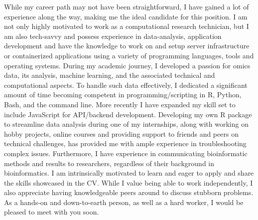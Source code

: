 \documentclass[11pt, a4paper]{awesome-cv}
\begin{document}
\begin{cvletter}
While my career path may not have been straightforward, I have gained a lot of experience along the way, making me the ideal candidate for this position. 
I am not only highly motivated to work as a computational research technician, but I am also tech-savvy and possess experience in data-analysis, application development and have the knowledge to work on and setup server infrastructure or containerized applications using a variety of programming languages, tools and operating systems.
During my academic journey, I developed a passion for omics data, its analysis, machine learning, and the associated technical and computational aspects.
To handle such data effectively, I dedicated a significant amount of time becoming competent in programming/scripting in R, Python, Bash, and the command line. 
More recently I have expanded my skill set to include JavaScript for API/backend development.
Developing my own R package to streamline data analysis during one of my internships, along with working on hobby projects, online courses and providing support to friends and peers on technical challenges, has provided me with ample experience in troubleshooting complex issues. 
Furthermore, I have experience in communicating bioinformatic methods and results to researchers, regardless of their background in bioinformatics.
I am intrinsically motivated to learn and eager to apply and share the skills showcased in the CV. 
While I value being able to work independently, I also appreciate having knowledgeable peers around to discuss stubborn problems. 
As a hands-on and down-to-earth person, as well as a hard worker, I would be pleased to meet with you soon.
\end{cvletter}
\makeletterclosing
\end{document}
